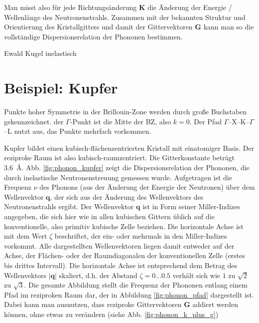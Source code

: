 Man misst also für jede Richtungsänderung $\mathbf{K}$ die Änderung der Energie / Wellenlänge des Neutronenstrahls. Zusammen mit der bekannten Struktur und Orientierung des Kristallgitters und damit der Gittervektoren $\mathbf{G}$ kann man so die vollständige Dispersionsrelation der Phononen bestimmen.

\begin{marginfigure}
\caption{Ewald Kugel inelastisch}
\end{marginfigure}




\newpage

\section{Beispiel: Kupfer}




\begin{marginfigure}
\caption{Punkte hoher Symmetrie in der Brillouin-Zone werden durch große Buchstaben gekennzeichnet. der $\Gamma$-Punkt ist die Mitte der BZ, also $k=0$. Der Pfad $\Gamma$--X--K--$\Gamma$--L nutzt aus, das Punkte mehrfach  vorkommen. \label{fig:phonon_pfad} }
\end{marginfigure}


Kupfer bildet einen kubisch-flächenzentrierten Kristall mit einatomiger Basis. Der reziproke Raum ist also kubisch-raumzentriert. Die Gitterkonstante beträgt 3.6~\AA. Abb. \ref{fig:phonon_kupfer} zeigt die Dispersionsrelation der Phononen, die durch inelastische Neutronenstreuung gemessen wurde. Aufgetragen ist die Frequenz $\nu$ des Phonons (aus der Änderung der Energie der Neutronen) über dem Wellenvektor $\mathbf{q}$, der sich aus der Änderung des Wellenvektors des Neutronenstrahls ergibt. 
Der Wellenvektor  $\mathbf{q}$  ist in Form seiner Miller-Indizes angegeben, die sich hier wie  in allen kubischen  Gittern üblich auf die konventionelle, also primitiv kubische  Zelle  beziehen. Die horizontale Achse ist mit dem Wert  $\zeta$  beschriftet, der ein- oder mehrmals in den Miller-Indizes vorkommt. Alle dargestellten Wellenvektoren liegen damit entweder auf der Achse, der 
Flächen- oder der  Raumdiagonalen der konventionellen Zelle (erstes bis drittes Intervall). Die horizontale Achse ist entsprechend dem Betrag des Wellenvektors 
 $|\mathbf{q}|$ skaliert, d.h. der Abstand $\zeta = 0 \dots 0.5$ verhält sich wie $1$ zu $\sqrt{2}$ zu $\sqrt{3}$. Die gesamte Abbildung stellt die Frequenz der Phononen entlang einem Pfad im reziproken Raum dar, der in Abbildung \ref{fig:phonon_pfad}  dargestellt ist. Dabei kann man ausnutzen, dass reziproke Gittervektoren $\mathbf{G}$ addiert werden können, ohne etwas  zu verändern (siehe Abb. \ref{fig:phonon_k_plus_g})
 
